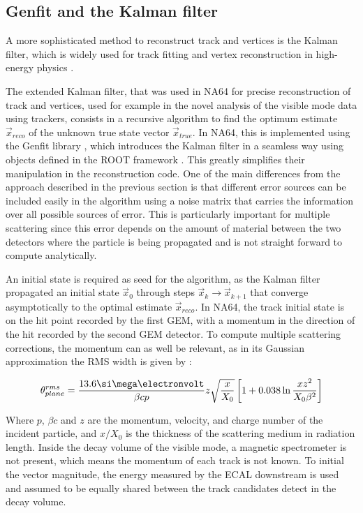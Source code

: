 \subsection{Genfit and the Kalman filter}
\label{appD:sec:kalman-filter}

A more sophisticated method to reconstruct track and vertices is the Kalman filter, which is widely used for track fitting and vertex reconstruction in high-energy physics \cite{HOPPNER2010518}.

The extended Kalman filter, that was used in NA64 for precise reconstruction of track and vertices, used for example in the novel analysis of the visible mode data using trackers, consists in a recursive algorithm to find the optimum estimate $\vec{x}_{reco}$ of the unknown true state vector $\vec{x}_{true}$. In NA64, this is implemented using the Genfit library \cite{genfit}, which introduces the Kalman filter in a seamless way using objects defined in the ROOT framework \cite{root}. This greatly simplifies their manipulation in the reconstruction code. One of the main differences from the approach described in the previous section is that different error sources can be included easily in the algorithm using a noise matrix that carries the information over all possible sources of error. This is particularly important for multiple scattering since this error depends on the amount of material between the two detectors where the particle is being propagated and is not straight forward to compute analytically.

An initial state is required as seed for the algorithm, as the Kalman filter propagated an initial state $\vec{x}_0$ through steps $\vec{x}_k \rightarrow \vec{x}_{k+1}$ that converge asymptotically to the optimal estimate $\vec{x}_{reco}$. In NA64, the track initial state is on the hit point recorded by the first GEM, with a momentum in the direction of the hit recorded by the second GEM detector. To compute multiple scattering corrections, the momentum can as well be relevant, as in its Gaussian approximation the RMS width is given by \cite{review-particle-physics}:

\begin{equation}
  \label{eq:mm-scattering}
  \theta_{plane}^{rms} = \frac{13.6 \mev}{\beta c p} z \sqrt{\frac{x}{X_0}} \left[ 1 + 0.038 \ln{\frac{x z^2}{X_0 \beta^2}} \right]
\end{equation}

Where $p$, $\beta c$ and $z$ are the momentum, velocity, and charge number of the incident particle, and $x/X_0$ is the thickness of the scattering medium in radiation length. Inside the decay volume of the visible mode, a magnetic spectrometer is not present, which means the momentum of each track is not known. To initial the vector magnitude, the energy measured by the ECAL downstream is used and assumed to be equally shared between the track candidates detect in the decay volume.

